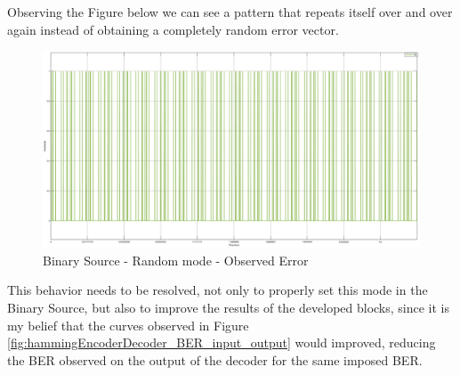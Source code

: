 \begin{refsection}
Observing the Figure below we can see a pattern that repeats itself over and over again instead of obtaining a completely random error vector.

\begin{figure}[h!]
	\centering
	\includegraphics[width=.9\linewidth]{./sdf/eit_25828_hamming_channel_encoder_decoder/images/ERROR.png}
	\vspace{-3mm}
	\caption{Binary Source - Random mode - Observed Error}
	\label{fig:hammingEncoderDecoder_BinarySource_ERROR}
\end{figure}

\vspace{30mm}

This behavior needs to be resolved, not only to properly set this mode in the Binary Source, but also to improve the results of the developed blocks, since it is my belief that the curves observed in Figure \ref{fig:hammingEncoderDecoder_BER_input_output} would improved, reducing the BER observed on the output of the decoder for the same imposed BER.




\clearpage
\printbibliography[heading=subbibliography]
\end{refsection}
\cleardoublepage
